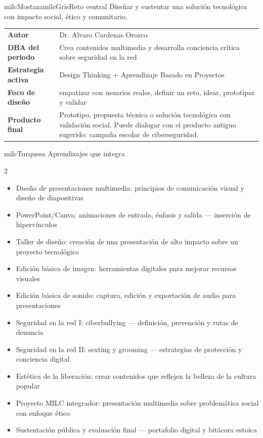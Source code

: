 \documentclass[11pt,letterpaper]{article}
\begin{document}
\begin{softbox}{milcMostaza}{milcGris}{Reto central}
Diseñar y sustentar una solución tecnológica con impacto social, ético y comunitario.
\end{softbox}

\begin{tabularx}{\textwidth}{>{\bfseries}p{3.4cm}X}
\rowcolor{milcMagenta!12}Autor & Dr. Alvaro Cardenas Orozco\\
DBA del periodo & Crea contenidos multimedia y desarrolla conciencia crítica sobre seguridad en la red\\
Estrategia activa & Design Thinking + Aprendizaje Basado en Proyectos\\
Foco de diseño & empatizar con usuarios reales, definir un reto, idear, prototipar y validar\\
Producto final & Prototipo, propuesta técnica o solución tecnológica con validación social. Puede dialogar con el producto antiguo sugerido: campaña escolar de ciberseguridad.\\
\end{tabularx}

\begin{titlebox}{milcTurquesa}
Aprendizajes que integra
\end{titlebox}
\begin{multicols}{2}
\begin{itemize}[leftmargin=*]
\item Diseño de presentaciones multimedia: principios de comunicación visual y diseño de diapositivas
\item PowerPoint/Canva: animaciones de entrada, énfasis y salida — inserción de hipervínculos
\item Taller de diseño: creación de una presentación de alto impacto sobre un proyecto tecnológico
\item Edición básica de imagen: herramientas digitales para mejorar recursos visuales
\item Edición básica de sonido: captura, edición y exportación de audio para presentaciones
\item Seguridad en la red I: ciberbullying — definición, prevención y rutas de denuncia
\item Seguridad en la red II: sexting y grooming — estrategias de protección y conciencia digital
\item Estética de la liberación: crear contenidos que reflejen la belleza de la cultura popular
\item Proyecto MILC integrador: presentación multimedia sobre problemática social con enfoque ético
\item Sustentación pública y evaluación final — portafolio digital y bitácora estoica
\end{itemize}
\end{multicols}
\end{document}
